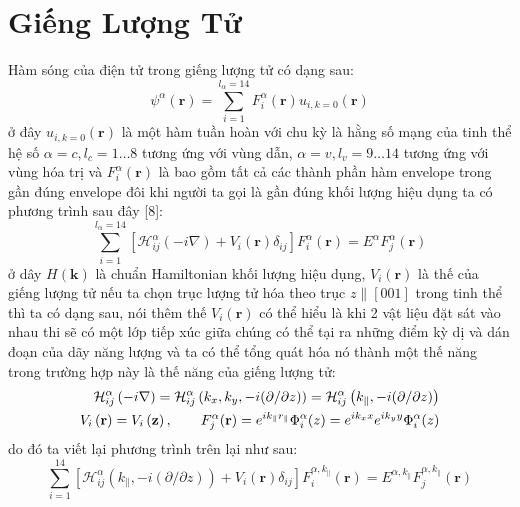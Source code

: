 \chapter{\bfseries Giếng Lượng Tử}
\label{Chapter4} %
Hàm sóng của điện tử trong giếng lượng tử có dạng sau:
\begin{equation}
\psi^{\alpha}(\mathbf{r})=\sum_{i=1}^{l_{\alpha}=14} F_i^{\alpha}(\mathbf{r})u_{i,k=0}(\mathbf{r})
\end{equation}
ở đây $u_{i,k=0}(\mathbf{r})$ là một hàm tuần hoàn với chu kỳ là hằng số mạng của tinh thể hệ số $\alpha=c,l_c=1\dots8$ tương ứng với vùng dẫn, $\alpha=v,l_v=9\dots 14$ tương ứng với vùng hóa trị  và $F_i^{\alpha}(\mathbf{r})$ là bao gồm tất cả các thành phần hàm envelope trong gần đúng envelope đôi khi người ta gọi là gần đúng khối lượng hiệu dụng ta có phương trình sau đây [8]:
\begin{equation}
\sum_{i=1}^{l_{\alpha}=14}\left[\mathcal{H}_{ij}^{\alpha}\left(-i\nabla\right) +V_i\left(\mathbf{r}\right)\delta_{ij}\right]F_i^{\alpha}(\mathbf{r})=E^{\alpha}F_j^{\alpha}(\mathbf{r})
\end{equation}
ở dây $H(\mathbf{k})$ là chuẩn Hamiltonian khối lượng hiệu dụng, $V_i\left(\mathbf{r}\right)$ là thế của giếng lượng tử nếu ta chọn trục lượng tử hóa theo trục $z\parallel[001]$ trong tinh thể thì ta có dạng sau, nói thêm thế $V_i\left(\mathbf{r}\right)$ có thể hiểu là khi 2 vật liệu đặt sát vào nhau thi sẽ có một lớp tiếp xúc giữa chúng có thể tại ra những điểm kỳ dị và dán đoạn của  dãy năng lượng và ta có thể tổng quát hóa nó thành một thế năng trong trường hợp này là thế năng của giếng lượng tử: 
\begin{align}
\mathcal{H}_{ij}^{\alpha}\left(-i\nabla\right)=\mathcal{H}_{ij}^{\alpha}\left(k_x,k_y,-i(\partial / \partial z)\right)=\mathcal{H}_{ij}^{\alpha}\left(k_{\parallel},-i(\partial / \partial z)\right)\notag \\
V_i\left(\mathbf{r}\right)=V_i\left(\mathbf{z}\right),\qquad F_j^{\alpha}(\mathbf{r})=e^{ik_{\parallel}r_{\parallel}}\Phi_i^{\alpha}(z)=e^{ik_xx}e^{ik_yy}\Phi_i^{\alpha}(z)
\end{align}
do đó ta viết lại phương trình trên lại như sau:
\begin{equation}
\sum_{i=1}^{14}\left[\mathcal{H}_{ij}^{\alpha}\left(k_{\parallel},-i(\partial / \partial z)\right) +V_i(\mathbf{r})\delta_{ij}\right]F_i^{\alpha ,k_{\parallel}}(\mathbf{r})=E^{\alpha ,k_{\parallel}}F_j^{\alpha ,k_{\parallel}}(\mathbf{r})
\end{equation}

